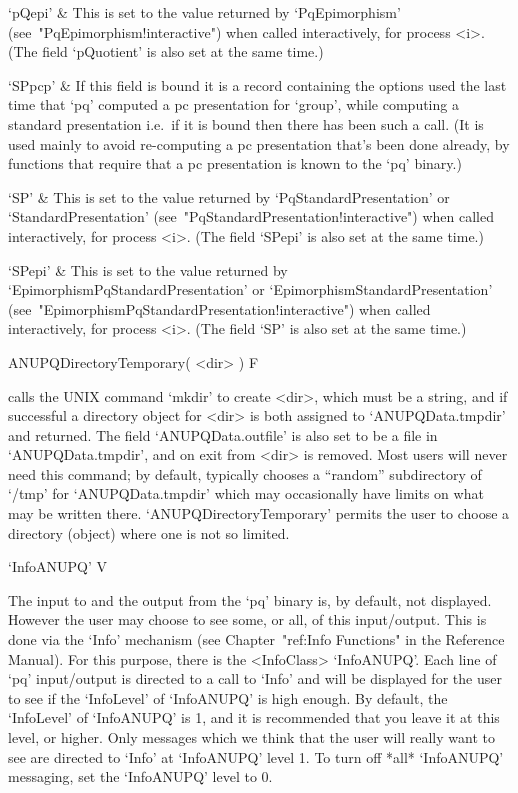 \quad`pQepi' & This is set  to  the  value  returned  by  `PqEpimorphism'
(see~"PqEpimorphism!interactive") when called interactively, for  process
<i>. (The field `pQuotient' is also set at the same time.)

\quad`SPpcp' & If this field is bound  it  is  a  record  containing  the
options used the last time that  `pq'  computed  a  pc  presentation  for
`group', while computing a standard presentation i.e.~if it is bound then
there has been such a call. (It is used mainly to avoid re-computing a pc
presentation that's been done already, by functions that require  that  a
pc presentation is known to the `pq' binary.)

\quad`SP' & This is set to the value returned by `PqStandardPresentation'
or `StandardPresentation' (see~"PqStandardPresentation!interactive") when
called interactively, for process <i>. (The field `SPepi' is also set  at
the same time.)

\quad`SPepi'   &   This   is   set   to    the    value    returned    by
`EpimorphismPqStandardPresentation' or  `EpimorphismStandardPresentation'
(see~"EpimorphismPqStandardPresentation!interactive")     when     called
interactively, for process <i>. (The field `SP' is also set at  the  same
time.)

\enditems

\>ANUPQDirectoryTemporary( <dir> ) F

calls the UNIX command `mkdir' to create <dir>, which must be  a  string,
and if successful a directory  object  for  <dir>  is  both  assigned  to
`ANUPQData.tmpdir' and returned. The field  `ANUPQData.outfile'  is  also
set to be a file in `ANUPQData.tmpdir', and on exit from {\GAP} <dir>  is
removed. Most users will never need  this  command;  by  default,  {\GAP}
typically   chooses   a   ``random''   subdirectory   of    `/tmp'    for
`ANUPQData.tmpdir' which may occasionally have  limits  on  what  may  be
written there. `ANUPQDirectoryTemporary' permits the  user  to  choose  a
directory (object) where one is not so limited.


\>`InfoANUPQ' V

The input to and the output from the `pq'  binary  is,  by  default,  not
displayed. However the user may choose to  see  some,  or  all,  of  this
input/output.   This   is   done   via   the   `Info'   mechanism    (see
Chapter~"ref:Info Functions" in the {\GAP} Reference  Manual).  For  this
purpose,  there  is  the  <InfoClass>  `InfoANUPQ'.  Each  line  of  `pq'
input/output is directed to a call to `Info' and will  be  displayed  for
the user to see if the `InfoLevel' of  `InfoANUPQ'  is  high  enough.  By
default, the `InfoLevel' of `InfoANUPQ' is 1, and it is recommended  that
you leave it at this level, or higher. Only messages which we think  that
the user will really want to see are directed to  `Info'  at  `InfoANUPQ'
level 1. To turn off *all* `InfoANUPQ'  messaging,  set  the  `InfoANUPQ'
level to 0.

